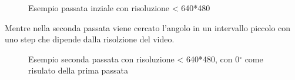\documentclass[12pt]{article}
\begin{document}
\begin{figure}[h!]
	\begin{center}
	  \caption{Esempio passata inziale con risoluzione < 640*480}
	\end{center}
\end{figure}

Mentre nella seconda passata viene cercato l'angolo in un intervallo piccolo con uno step
che dipende dalla risolzione del video.

\begin{figure}[h!]
	\begin{center}
	  \caption{Esempio seconda passata con risoluzione < 640*480, con 0$^{\circ}$ come risulato della prima passata}
	\end{center}
\end{figure}
\end{document}
